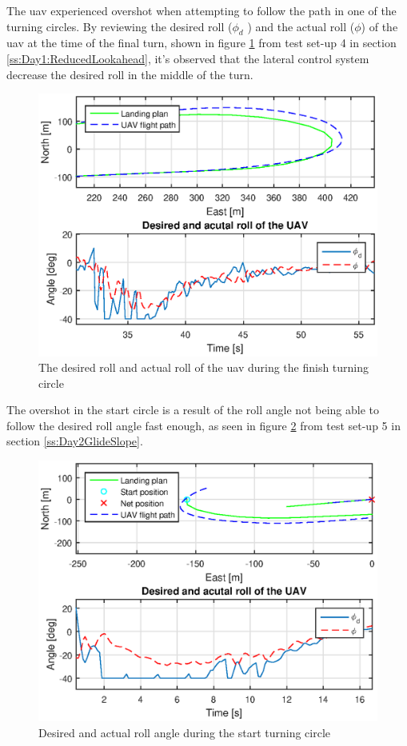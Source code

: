 The \gls{uav} experienced overshot when attempting to follow the path in one of the turning circles. By reviewing the desired roll ($\phi_d$ ) and the actual roll ($\phi$) of the \gls{uav} at the time of the final turn, shown in figure \ref{Fig:DesiredRoll131844} from test set-up 4 in section \ref{ss:Day1:ReducedLookahead}, it's observed that the lateral control system decrease the desired roll in the middle of the turn.
\begin{figure}[H]
\centering
\includegraphics[scale=0.7]{figs/Experiment/rollDesired131844.eps}
\caption{The desired roll and actual roll of the \gls{uav} during the finish turning circle}
\label{Fig:DesiredRoll131844}
\end{figure}
The overshot in the start circle is a result of the roll angle not being able to follow the desired roll angle fast enough, as seen in figure \ref{Fig:Roll1juni081328} from test set-up 5 in section \ref{ss:Day2GlideSlope}.
\newpage
\begin{figure}[H]
\centering
\includegraphics[scale=0.7]{figs/Experiment/Roll1juni081328.eps}
\caption{Desired and actual roll angle during the start turning circle}
\label{Fig:Roll1juni081328}
\end{figure}
